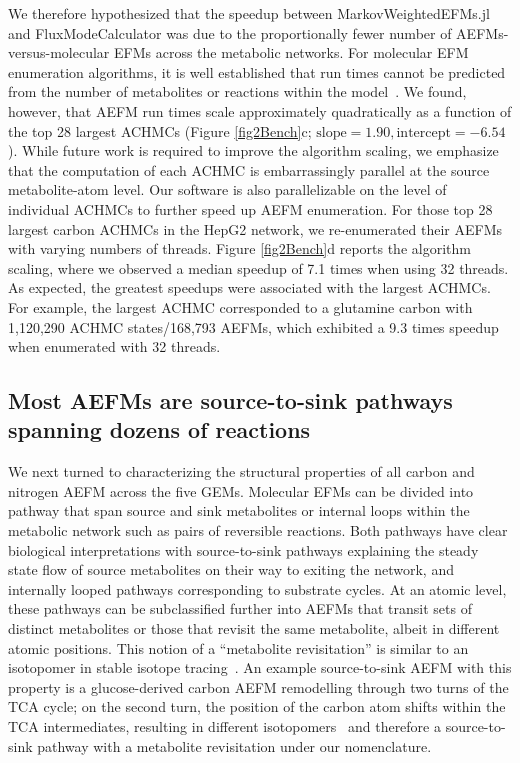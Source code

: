 \documentclass[12pt]{article}
\begin{document}
We therefore hypothesized that the speedup between MarkovWeightedEFMs.jl
and FluxModeCalculator was due to the proportionally fewer number of
AEFMs-versus-molecular EFMs across the metabolic networks. For molecular
EFM enumeration algorithms, it is well established that run times cannot
be predicted from the number of metabolites or reactions within the
model~\citep{UllahEhsan2020Tsef}. We found, however, that AEFM run times
scale approximately quadratically as a function of the top 28 largest
ACHMCs (Figure \ref{fig2Bench}c; $\text{slope}=1.90, \text{intercept}=-6.54$). While
future work is required to improve the algorithm scaling, we emphasize
that the computation of each ACHMC is embarrassingly parallel at the
source metabolite-atom level. Our software is also parallelizable on the
level of individual ACHMCs to further speed up AEFM enumeration. For those
top 28 largest carbon ACHMCs in the HepG2 network, we re-enumerated their
AEFMs with varying numbers of threads. Figure \ref{fig2Bench}d reports the algorithm
scaling, where we observed a median speedup of 7.1 times when using 32
threads. As expected, the greatest speedups were associated with the
largest ACHMCs. For example, the largest ACHMC corresponded to a glutamine
carbon with 1,120,290 ACHMC states/168,793 AEFMs, which exhibited a 9.3
times speedup when enumerated with 32 threads.

\fi

\subsection*{Most AEFMs are source-to-sink pathways spanning dozens of reactions}

We next turned to characterizing the structural properties of all carbon
and nitrogen AEFM across the five GEMs. Molecular EFMs can be divided into
pathway that span source and sink metabolites or internal loops within the
metabolic network such as pairs of reversible reactions. Both pathways
have clear biological interpretations with source-to-sink pathways
explaining the steady state flow of source metabolites on their way to
exiting the network, and internally looped pathways corresponding to
substrate cycles. At an atomic level, these pathways can be subclassified
further into AEFMs that transit sets of distinct metabolites or those that
revisit the same metabolite, albeit in different atomic positions. This notion
of a ``metabolite revisitation'' is similar to an isotopomer in stable isotope
tracing~\citep{AntoniewiczMaciekR2018Agt1}. An example source-to-sink AEFM
with this property is a glucose-derived carbon AEFM remodelling through
two turns of the TCA cycle; on the second turn, the position of the carbon
atom shifts within the TCA intermediates, resulting in different
isotopomers~\citep{DuanLikun20221tas} and therefore a source-to-sink
pathway with a metabolite revisitation under our nomenclature.
\end{document}
